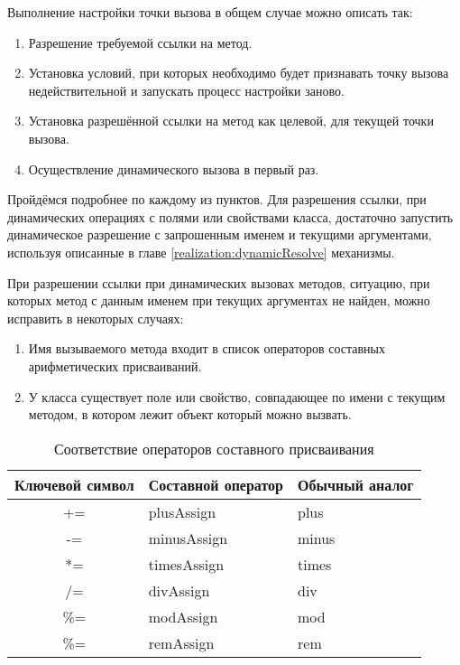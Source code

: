 Выполнение настройки точки вызова в общем случае можно описать так:

\begin{enumerate}
\item Разрешение требуемой ссылки на метод.
\item Установка условий, при которых необходимо будет признавать точку вызова недействительной и запускать процесс настройки заново.
\item Установка разрешённой ссылки на метод как целевой, для текущей точки вызова.
\item Осуществление динамического вызова в первый раз.
\end{enumerate}

Пройдёмся подробнее по каждому из пунктов. Для разрешения ссылки, при динамических операциях с полями или свойствами класса, достаточно запустить динамическое разрешение с запрошенным именем и текущими аргументами, используя описанные в главе \ref{realization:dynamicResolve} механизмы.

При разрешении ссылки при динамических вызовах методов, ситуацию, при которых метод с данным именем при текущих аргументах не найден, можно исправить в некоторых случаях:

\begin{enumerate}
    \item Имя вызываемого метода входит в список операторов составных арифметических присваиваний.
    \item У класса существует поле или свойство, совпадающее по имени с текущим методом, в котором лежит объект который можно вызвать.
\end{enumerate}


\begin{table}[h]
\caption{\label{tab:compoundAssignment}Соответствие операторов составного присваивания}
\begin{center}
\begin{tabular}{|c|l|l|}
\hline
Ключевой символ & Составной оператор	& Обычный аналог \\
\hline
+=  & plusAssign             & plus   \\
-=  & minusAssign            & minus  \\
*=  & timesAssign            & times  \\
/=  & divAssign              & div    \\
\%= & modAssign              & mod    \\
\%= & remAssign\footnotemark & rem\footnotemark[\value{footnote}]   \\
\hline
\end{tabular}
\end{center}
\end{table} 

